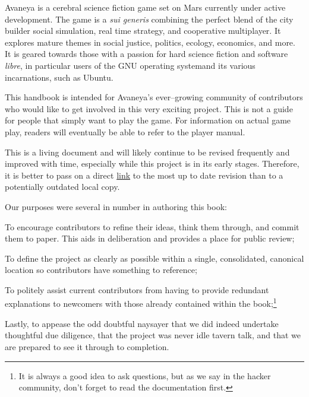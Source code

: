 

Avaneya is a cerebral science fiction game set on Mars currently under active development. The game is a {\it sui generis} combining the perfect blend of the city builder social simulation, real time strategy, and cooperative multiplayer. It explores mature themes in social justice, politics, ecology, economics, and more. It is geared towards those with a passion for hard science fiction and software {\it libre}, in particular users of the GNU operating system and its various incarnations, such as Ubuntu.

This handbook is intended for Avaneya's ever--growing community of contributors who would like to get involved in this very exciting project. This is not a guide for people that simply want to play the game. For information on actual game play, readers will eventually be able to refer to the player manual.

This is a living document and will likely continue to be revised frequently and improved with time, especially while this project is in its early stages. Therefore, it is better to pass on a direct \href{\LatestHandbookURL}{link} to the most up to date revision than to a potentially outdated local copy.

Our purposes were several in number in authoring this book:

\startitemize[4]
\item
To encourage contributors to refine their ideas, think them through, and commit them to paper. This aids in deliberation and provides a place for public review;

\item
To define the project as clearly as possible within a single, consolidated, canonical location so contributors have something to reference;

\item
To politely assist current contributors from having to provide redundant explanations to newcomers with those already contained within the book;\footnote[rtfm]{It is always a good idea to ask questions, but as we say in the hacker community, don't forget to read the documentation first.}

\item
Lastly, to appease the odd doubtful naysayer that we did indeed undertake thoughtful due diligence, that the project was never idle tavern talk, and that we are prepared to see it through to completion.
\stopitemize

